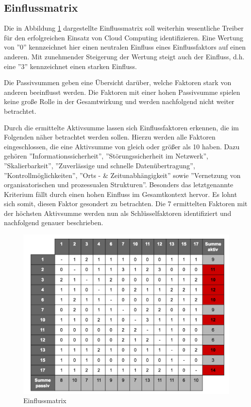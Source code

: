 \subsection{Einflussmatrix}

Die in Abbildung \ref{fig:matrix} dargestellte Einflussmatrix soll weiterhin wesentliche Treiber für den erfolgreichen Einsatz von Cloud Computing identifizieren. Eine Wertung von ''0'' kennzeichnet hier einen neutralen Einfluss eines Einflussfaktors auf einen anderen. Mit zunehmender Steigerung der Wertung steigt auch der Einfluss, d.h. eine ''3'' kennzeichnet einen starken Einfluss. 

Die Passivsummen geben eine Übersicht darüber, welche Faktoren stark von anderen beeinflusst werden. Die Faktoren mit einer hohen Passivsumme spielen keine große Rolle in der Gesamtwirkung und werden nachfolgend nicht weiter betrachtet.

Durch die ermittelte Aktivsumme lassen sich Einflussfaktoren erkennen, die im Folgenden näher betrachtet werden sollen. Hierzu werden alle Faktoren eingeschlossen, die eine Aktivsumme von gleich oder größer als 10 haben. Dazu gehören ''Informationssicherheit'', ''Störungssicherheit im Netzwerk'', ''Skalierbarkeit'', ''Zuverlässige und schnelle Datenübertragung'', ''Kontrollmöglichkeiten'', ''Orts - \& Zeitunabhängigkeit'' sowie ''Vernetzung von organisatorischen und prozessualen Strukturen''. Besonders das letztgenannte Kriterium fällt durch einen hohen Einfluss im Gesamtkontext hervor. Es lohnt sich somit, diesen Faktor gesondert zu betrachten. Die 7 ermittelten Faktoren mit der höchsten Aktivsumme werden nun als Schlüsselfaktoren identifiziert und nachfolgend genauer beschrieben.

\begin{figure}
	\centering
	\includegraphics[width=\linewidth]{images/matrix}
	\caption[Caption for parameters]{Einflussmatrix}
	\label{fig:matrix}
\end{figure}

